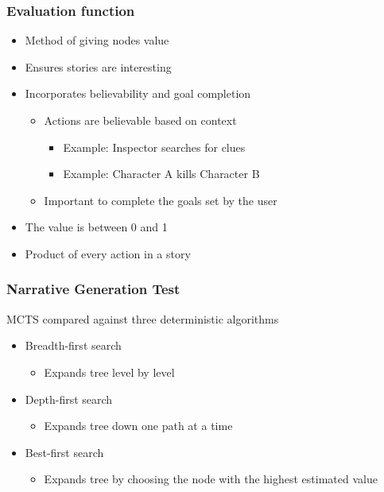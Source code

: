 \documentclass{beamer}
\begin{document}
\begin{frame}
\frametitle{Evaluation function}
\begin{itemize}
	\item Method of giving nodes value
	\item Ensures stories are interesting
	\item Incorporates believability and goal completion
	\begin{itemize}
		\item Actions are believable based on context
		\begin{itemize}
			\item Example: Inspector searches for clues
			\item Example: Character A kills Character B
		\end{itemize}
		\item Important to complete the goals set by the user
	\end{itemize}
	\item The value is between 0 and 1
	\item Product of every action in a story
\end{itemize}
\end{frame}

\begin{frame}
\frametitle{Narrative Generation Test}
MCTS compared against three deterministic algorithms
\begin{itemize}
	\item Breadth-first search
	\begin{itemize}
		\item Expands tree level by level
	\end{itemize}
	\item Depth-first search
	\begin{itemize}
		\item Expands tree down one path at a time
	\end{itemize}
	\item Best-first search
	\begin{itemize}
		\item Expands tree by choosing the node with the highest estimated value
	\end{itemize}
\end{itemize}
\end{frame}
\end{document}
